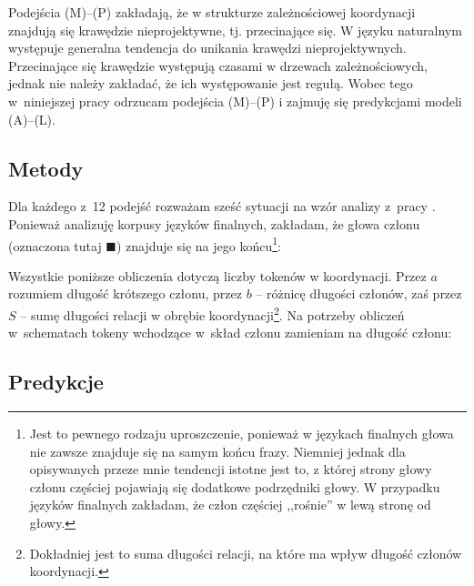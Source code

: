 Podejścia (M)--(P) zakładają, że w strukturze zależnościowej koordynacji znajdują się krawędzie nieprojektywne, tj. przecinające się. W języku naturalnym występuje generalna tendencja do unikania krawędzi nieprojektywnych. %
Przecinające się krawędzie występują czasami w drzewach zależnościowych, jednak nie należy zakładać, że ich występowanie jest regułą. Wobec tego w~niniejszej pracy odrzucam podejścia (M)--(P) i zajmuję się predykcjami modeli (A)--(L).

\subsection{Metody}

Dla każdego z~12 podejść rozważam sześć sytuacji na wzór analizy z~pracy \cite{przepiorkowski2023conjunct}. Ponieważ analizuję korpusy języków finalnych, zakładam, że głowa członu (oznaczona tutaj $\blacksquare$) znajduje się na jego końcu\footnote{
Jest to pewnego rodzaju uproszczenie, ponieważ w językach finalnych głowa nie zawsze znajduje się na samym końcu frazy. Niemniej jednak dla opisywanych przeze mnie tendencji istotne jest to, z której strony głowy członu częściej pojawiają się dodatkowe podrzędniki głowy. W przypadku języków finalnych zakładam, że człon częściej ,,rośnie'' w lewą stronę od głowy.}:



Wszystkie poniższe obliczenia dotyczą liczby tokenów w koordynacji. Przez $a$ rozumiem długość krótszego członu, przez $b$ -- różnicę długości członów, zaś przez $S$ -- sumę długości relacji w obrębie koordynacji\footnote{Dokładniej jest to suma długości relacji, na które ma wpływ długość członów koordynacji.}. Na potrzeby obliczeń w~schematach tokeny wchodzące w~skład członu zamieniam na długość członu:



\subsection{Predykcje}















